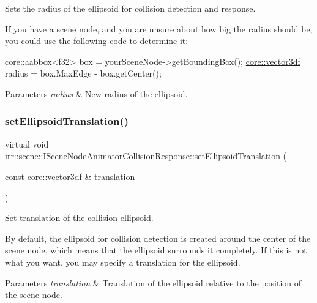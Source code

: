 Sets the radius of the ellipsoid for collision detection and response. 

If you have a scene node, and you are unsure about how big the radius should be, you could use the following code to determine it\+: 
\begin{DoxyCode}
core::aabbox<f32> box = yourSceneNode->getBoundingBox();
\hyperlink{namespaceirr_1_1core_a06f169d08b5c429f5575acb7edbad811}{core::vector3df} radius = box.MaxEdge - box.getCenter();
\end{DoxyCode}
 
\begin{DoxyParams}{Parameters}
{\em radius} & New radius of the ellipsoid. \\
\hline
\end{DoxyParams}
\mbox{\label{classirr_1_1scene_1_1ISceneNodeAnimatorCollisionResponse_a234ec747d320d70dd3e2a4143782ffc7}} 
\subsubsection{\texorpdfstring{set\+Ellipsoid\+Translation()}{setEllipsoidTranslation()}}
{\footnotesize\ttfamily virtual void irr\+::scene\+::\+I\+Scene\+Node\+Animator\+Collision\+Response\+::set\+Ellipsoid\+Translation (\begin{DoxyParamCaption}\item[{const \hyperlink{namespaceirr_1_1core_a06f169d08b5c429f5575acb7edbad811}{core\+::vector3df} \&}]{translation }\end{DoxyParamCaption})\hspace{0.3cm}{\ttfamily [pure virtual]}}



Set translation of the collision ellipsoid. 

By default, the ellipsoid for collision detection is created around the center of the scene node, which means that the ellipsoid surrounds it completely. If this is not what you want, you may specify a translation for the ellipsoid. 
\begin{DoxyParams}{Parameters}
{\em translation} & Translation of the ellipsoid relative to the position of the scene node. \\
\hline
\end{DoxyParams}
\mbox{\label{classirr_1_1scene_1_1ISceneNodeAnimatorCollisionResponse_af366695a82153c144b58c65cb4d092f3}} 
